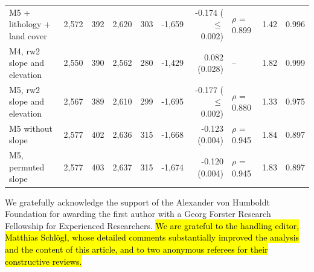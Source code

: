 \documentclass[journal abbreviation, manuscript]{copernicus}
\newcommand{\hlE}[1]{{\sethlcolor{edcyan}\hl{#1}}}
\begin{document}
\begin{table}[h]
\begin{tabular}{@{}lrrrrrrlrr@{}}
M5 + lithology + land cover & 2,572 & 392 & 2,620 & 303 & -1,659 & -0.174 ($\leq$0.002) & $\rho$ = 0.899 & 1.42 & 0.996 \\
M4, rw2 slope and elevation & 2,550 & 390 & 2,562 & 280 & -1,429 & 0.082 (0.028) & -- & 1.82 & 0.999 \\
M5, rw2 slope and elevation & 2,567 & 389 & 2,610 & 299 & -1,695 & -0.177 ($\leq$0.002) & $\rho$ = 0.880 & 1.33 & 0.975 \\
M5 without slope & 2,577 & 402 & 2,636 & 315 & -1,668 & -0.123 (0.004) & $\rho$ = 0.945 & 1.84 & 0.897 \\
M5, permuted slope & 2,577 & 403 & 2,637 & 315 & -1,674 & -0.120 (0.004) & $\rho$ = 0.945 & 1.83 & 0.897 \\
\bottomrule
\end{tabular}
\end{table}

\noappendix




\begin{acknowledgements}
We gratefully acknowledge the support of the Alexander von Humboldt Foundation for awarding the first author with a Georg Forster Research Fellowship for Experienced Researchers. \hlE{We are grateful to the handling editor, Matthias Schl\"{o}gl, whose detailed comments substantially improved the analysis and the content of this article, and to two anonymous referees for their constructive reviews.}
\end{acknowledgements}




\end{document}

